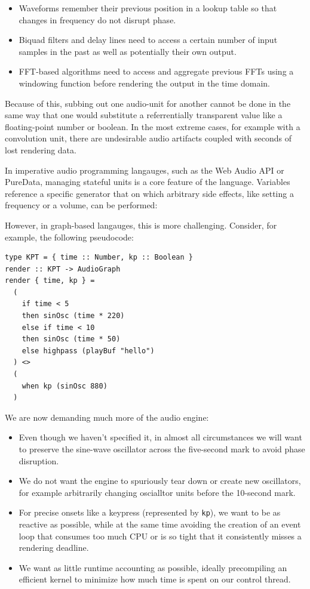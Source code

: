 \documentclass{article}
\begin{document}
\begin{itemize}
\item Waveforms remember their previous position in a lookup table so that changes in frequency do not disrupt phase.
\item Biquad filters and delay lines need to access a certain number of input samples in the past as well as potentially their own output.
\item FFT-based algorithms need to access and aggregate previous FFTs using a windowing function before rendering the output in the time domain.
\end{itemize}

Because of this, subbing out one audio-unit for another cannot be done in the same way that one would substitute a referrentially transparent value like a floating-point number or boolean. In the most extreme cases, for example with a convolution unit, there are undesirable audio artifacts coupled with seconds of lost rendering data.

In imperative audio programming langauges, such as the Web Audio API or PureData, managing stateful units is a core feature of the language. Variables reference a specific generator that on which arbitrary side effects, like setting a frequency or a volume, can be performed:

%

However, in graph-based langauges, this is more challenging. Consider, for example, the following pseudocode:

\lstset{language=Haskell, style=psstyle}
\begin{lstlisting}
type KPT = { time :: Number, kp :: Boolean }
render :: KPT -> AudioGraph
render { time, kp } =
  (
    if time < 5
    then sinOsc (time * 220)
    else if time < 10
    then sinOsc (time * 50)
    else highpass (playBuf "hello")
  ) <>
  (
    when kp (sinOsc 880)
  )
\end{lstlisting}

We are now demanding much more of the audio engine:
\begin{itemize}
\item Even though we haven't specified it, in almost all circumstances we will want to preserve the sine-wave oscillator across the five-second mark to avoid phase disruption.
\item We do not want the engine to spuriously tear down or create new oscillators, for example arbitrarily changing oscialltor units before the 10-second mark.
\item For precise onsets like a keypress (represented by \texttt{kp}), we want to be as reactive as possible, while at the same time avoiding the creation of an event loop that consumes too much CPU or is so tight that it consistently misses a rendering deadline.
\item We want as little runtime accounting as possible, ideally precompiling an efficient kernel to minimize how much time is spent on our control thread.
\end{itemize}
\end{document}
